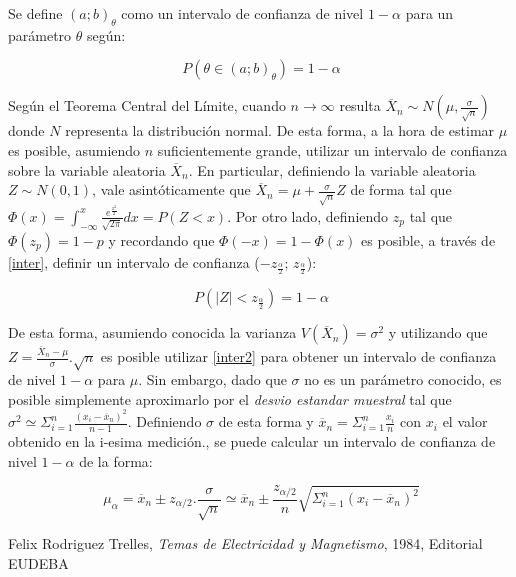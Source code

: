\documentclass[11pt,a4paper]{article}
\begin{document}
Se define $(a;b)_{\theta}$ como un intervalo de confianza de nivel $1-\alpha$ para un parámetro $\theta$ según:

\begin{equation}\label{inter}
\ P(\theta\in(a;b)_{\theta})= 1-\alpha
\end{equation}

Según el Teorema Central del Límite, cuando $n\rightarrow\infty$ resulta $\overline{X}_n \sim N(\mu, \frac{\sigma}{\sqrt{n}})$ donde $N$ representa la distribución normal. De esta forma, a la hora de estimar $\mu$ es posible, asumiendo $n$ suficientemente grande, utilizar un intervalo de confianza sobre la variable aleatoria $\overline{X}_n$. En particular, definiendo la variable aleatoria $Z \sim N(0,1)$, vale asintóticamente que $\overline{X}_n = \mu + \frac{\sigma}{\sqrt{n}}Z$ de forma tal que $\Phi(x) = \int_{-\infty}^x \frac{e^{\frac{x^2}{2}}}{\sqrt{2\pi}} dx = P(Z<x)$. Por otro lado, definiendo $z_{p}$ tal que $\Phi(z_{p}) = 1-p$ y recordando que $\Phi(-x) = 1-\Phi(x)$ es posible, a través de \eqref{inter}, definir un intervalo de confianza ($-z_{\frac{\alpha}{2}}$; $z_{\frac{\alpha}{2}}$):

\begin{equation}\label{inter2}
\ P(|Z|<z_{\frac{\alpha}{2}})= 1-\alpha
\end{equation}

De esta forma, asumiendo conocida la varianza $V(\overline{X}_n) = \sigma^2$ y utilizando que $Z = \frac{\overline{X}_n-\mu}{\sigma}.\sqrt{n}$ es posible utilizar \eqref{inter2} para obtener un intervalo de confianza de nivel $1-\alpha$ para $\mu$. Sin embargo, dado que $\sigma$ no es un parámetro conocido, es posible simplemente aproximarlo por el \textit{desvio estandar muestral} tal que $\sigma^2 \simeq \Sigma_{i=1}^{n}\frac{(x_i-\overline{x}_n)^2}{n-1}$. Definiendo $\sigma$ de esta forma y $\overline{x}_n = \Sigma_{i=1}^{n} \frac{x_i}{n}$ con $x_i$ el valor obtenido en la i-esima medición., se puede calcular un intervalo de confianza de nivel $1-\alpha$ de la forma:

\begin{equation}\label{inter_final}
\ \mu_{\alpha} = \overline{x}_n \pm z_{\alpha/2}.\frac{\sigma}{\sqrt{n}} \simeq \overline{x}_n \pm \frac{z_{\alpha/2}}{n} \sqrt{\Sigma_{i=1}^{n}(x_i-\overline{x}_n)^2}
\end{equation}



\begin{thebibliography}{1}
  Felix Rodriguez Trelles, \textit{Temas de Electricidad y Magnetismo}, 1984, Editorial EUDEBA
\end{thebibliography}
 
\end{document}
